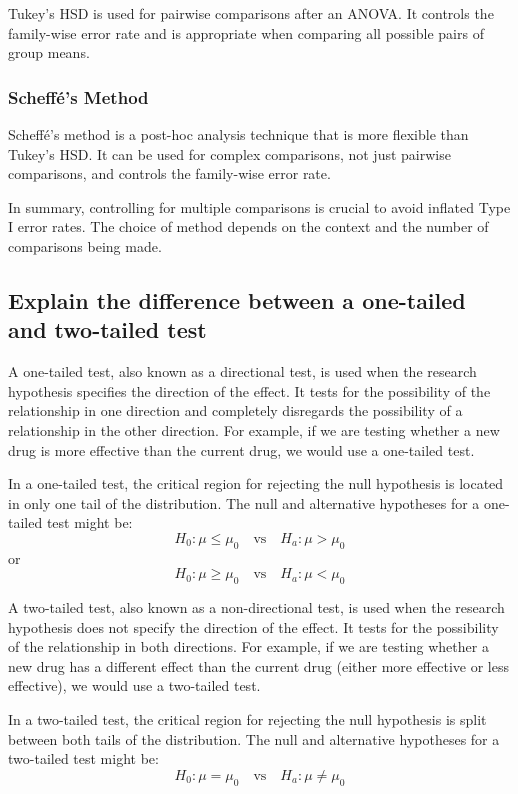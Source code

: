 \documentclass[12pt]{article}
\begin{document}
Tukey's HSD is used for pairwise comparisons after an ANOVA. It controls the family-wise error rate and is appropriate when comparing all possible pairs of group means.

\subsubsection{Scheffé's Method}

Scheffé's method is a post-hoc analysis technique that is more flexible than Tukey's HSD. It can be used for complex comparisons, not just pairwise comparisons, and controls the family-wise error rate.

In summary, controlling for multiple comparisons is crucial to avoid inflated Type I error rates. The choice of method depends on the context and the number of comparisons being made.

\subsection{Explain the difference between a one-tailed and two-tailed test}

A one-tailed test, also known as a directional test, is used when the research hypothesis specifies the direction of the effect. It tests for the possibility of the relationship in one direction and completely disregards the possibility of a relationship in the other direction. For example, if we are testing whether a new drug is more effective than the current drug, we would use a one-tailed test.

In a one-tailed test, the critical region for rejecting the null hypothesis is located in only one tail of the distribution. The null and alternative hypotheses for a one-tailed test might be:
\[
H_0: \mu \leq \mu_0 \quad \text{vs} \quad H_a: \mu > \mu_0
\]
or
\[
H_0: \mu \geq \mu_0 \quad \text{vs} \quad H_a: \mu < \mu_0
\]

A two-tailed test, also known as a non-directional test, is used when the research hypothesis does not specify the direction of the effect. It tests for the possibility of the relationship in both directions. For example, if we are testing whether a new drug has a different effect than the current drug (either more effective or less effective), we would use a two-tailed test.

In a two-tailed test, the critical region for rejecting the null hypothesis is split between both tails of the distribution. The null and alternative hypotheses for a two-tailed test might be:
\[
H_0: \mu = \mu_0 \quad \text{vs} \quad H_a: \mu \neq \mu_0
\]
\end{document}
